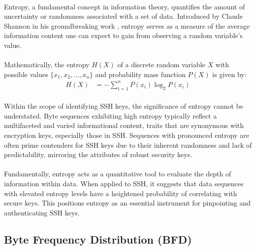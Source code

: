         \paragraph{}Entropy, a fundamental concept in information theory, quantifies the amount of uncertainty or randomness associated with a set of data. Introduced by Claude Shannon in his groundbreaking work \cite{shannon_mathematical_1948}, entropy serves as a measure of the average information content one can expect to gain from observing a random variable's value.

        \paragraph{}Mathematically, the entropy \(H(X)\) of a discrete random variable \(X\) with possible values \newline \(\{x_1, x_2, \ldots, x_n\}\) and probability mass function \(P(X)\) is given by:
        \begin{align}
            H(X) &= -\sum_{i=1}^{n} P(x_i) \log_2 P(x_i)
            \label{eq:shannon_entropy}
        \end{align}

        \paragraph{}Within the scope of identifying SSH keys, the significance of entropy cannot be understated. Byte sequences exhibiting high entropy typically reflect a multifaceted and varied informational content, traits that are synonymous with encryption keys, especially those in SSH. Sequences with pronounced entropy are often prime contenders for SSH keys due to their inherent randomness and lack of predictability, mirroring the attributes of robust security keys.

        \paragraph{}Fundamentally, entropy acts as a quantitative tool to evaluate the depth of information within data. When applied to SSH, it suggests that data sequences with elevated entropy levels have a heightened probability of correlating with secure keys. This positions entropy as an essential instrument for pinpointing and authenticating SSH keys.
    \subsection{Byte Frequency Distribution (BFD)}\label{seq:background:byte_frequency_distribution}
